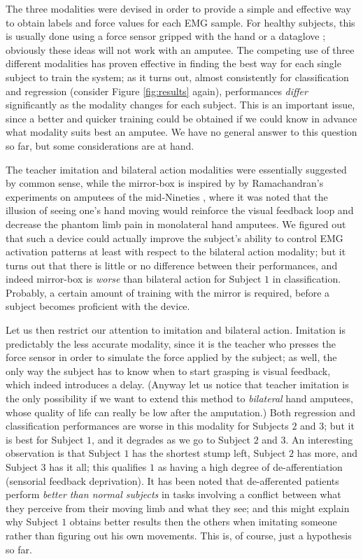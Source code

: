 The three modalities were devised in order to provide a simple and effective
way to obtain labels and force values for each EMG sample. For healthy
subjects, this is usually done using a force sensor gripped with the hand
\cite{2008.BioCyb} or a dataglove \cite{sebelius}; obviously these ideas
will not work with an amputee.
The competing use of three different modalities has proven effective in finding
the best way for each single subject to train the system; as it turns out,
almost consistently for classification and regression (consider Figure
\ref{fig:results} again), performances \emph{differ} significantly as
the modality changes for each subject. This is an important issue, since
a better and quicker training could be obtained if we could
know in advance what modality suits best an amputee. We have no general
answer to this question so far, but some considerations are at hand.

The teacher imitation and bilateral action
modalities were essentially suggested by common sense, while the mirror-box
is inspired by by Ramachandran's experiments on amputees of the
mid-Nineties \cite{ramachandran96}, where it was noted that the illusion of
seeing one's hand moving would reinforce the visual feedback loop and decrease
the phantom limb pain in monolateral hand amputees. We figured out that such
a device could actually improve the subject's ability to control EMG
activation patterns at least with respect to the bilateral action modality;
but it turns out that there is little or no difference between their performances,
and indeed mirror-box is \emph{worse} than bilateral action for Subject $1$ in
classification. Probably, a certain amount of training with the mirror is required,
before a subject becomes proficient with the device.

Let us then restrict our attention to imitation and bilateral action.
Imitation is predictably the less accurate modality, since it is the
teacher who presses the force sensor in order to simulate the force applied by the
subject; as well, the only way the subject has to know when to start grasping
is visual feedback, which indeed introduces a delay. (Anyway let us notice that
teacher imitation is the only possibility if we want to extend this method to
\emph{bilateral} hand amputees, whose quality of life can really be low after
the amputation.)
Both regression and classification performances are worse in this modality for Subjects
$2$ and $3$; but it is best for Subject $1$, and it degrades
as we go to Subject $2$ and $3$. An interesting observation is that Subject $1$
has the shortest stump left, Subject $2$ has more, and Subject $3$ has it all;
this qualifies $1$ as having a high degree of de-afferentiation (sensorial
feedback deprivation). It has been noted \cite{lajoie02,miall07}
that de-afferented patients perform \emph{better than normal subjects}
in tasks involving a conflict between what they perceive from their
moving limb and what they see; and this might explain why Subject $1$
obtains better results then the others when imitating someone rather
than figuring out his own movements. This is, of course, just a
hypothesis so far.
